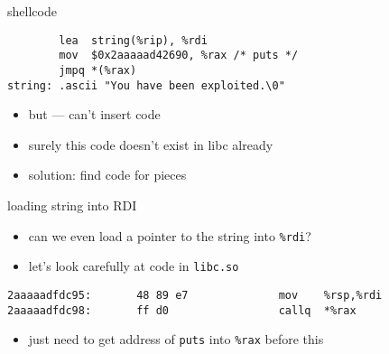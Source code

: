 \begin{frame}[fragile,label=shellcode]{shellcode}
\begin{lstlisting}
        lea  string(%rip), %rdi
        mov  $0x2aaaaad42690, %rax /* puts */
        jmpq *(%rax)
string: .ascii "You have been exploited.\0"
\end{lstlisting}
    \begin{itemize}
        \item but --- can't insert code
        \item surely this code doesn't exist in libc already
        \item solution: find code for pieces
    \end{itemize}
\end{frame}

\begin{frame}[fragile,label=loadRDICode]{loading string into RDI}
    \begin{itemize}
        \item can we even load a pointer to the string into {\tt \%rdi}?
        \item let's look carefully at code in {\tt libc.so}
    \end{itemize}
\begin{lstlisting}
2aaaaadfdc95:       48 89 e7              mov    %rsp,%rdi
2aaaaadfdc98:       ff d0                 callq  *%rax
\end{lstlisting}
    \begin{itemize}
        \item just need to get address of {\tt puts} into {\tt \%rax} before this
    \end{itemize}
\end{frame}

